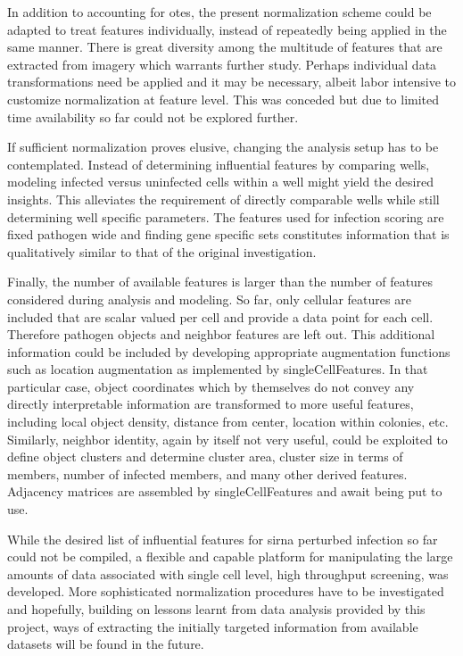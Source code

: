 In addition to accounting for \glspl{ote}, the present normalization scheme could be adapted to treat features individually, instead of repeatedly being applied in the same manner. There is great diversity among the multitude of features that are extracted from imagery which warrants further study. Perhaps individual data transformations need be applied and it may be necessary, albeit labor intensive to customize normalization at feature level. This was conceded but due to limited time availability so far could not be explored further.

If sufficient normalization proves elusive, changing the analysis setup has to be contemplated. Instead of determining influential features by comparing wells, modeling infected versus uninfected cells within a well might yield the desired insights. This alleviates the requirement of directly comparable wells while still determining well specific parameters. The features used for infection scoring are fixed pathogen wide and finding gene specific sets constitutes information that is qualitatively similar to that of the original investigation.

Finally, the number of available features is larger than the number of features considered during analysis and modeling. So far, only cellular features are included that are scalar valued per cell and provide a data point for each cell. Therefore pathogen objects and neighbor features are left out. This additional information could be included by developing appropriate augmentation functions such as location augmentation as implemented by singleCellFeatures. In that particular case, object coordinates which by themselves do not convey any directly interpretable information are transformed to more useful features, including local object density, distance from center, location within colonies, etc. Similarly, neighbor identity, again by itself not very useful, could be exploited to define object clusters and determine cluster area, cluster size in terms of members, number of infected members, and many other derived features. Adjacency matrices are assembled by singleCellFeatures and await being put to use.

While the desired list of influential features for \gls{sirna} perturbed infection so far could not be compiled, a flexible and capable platform for manipulating the large amounts of data associated with single cell level, high throughput screening, was developed. More sophisticated normalization procedures have to be investigated and hopefully, building on lessons learnt from data analysis provided by this project, ways of extracting the initially targeted information from available datasets will be found in the future.
